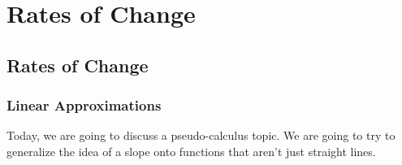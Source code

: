 \edef\mychapter{Rates of Change}
\edef\mychapterdate{July 10, 2024}

\chapter{\mychapter}

\section{Rates of Change}
\subsection{Linear Approximations}
Today, we are going to discuss a pseudo-calculus topic. We are going to try to generalize the idea of a slope onto functions that aren't just straight lines.

